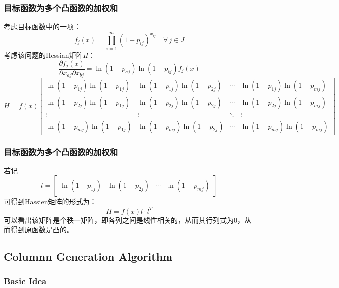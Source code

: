 \documentclass[10pt]{beamer}
\begin{document}
\begin{frame}
    \frametitle{目标函数为多个凸函数的加权和}
    考虑目标函数中的一项：
    \begin{equation*}
        f_j(x) =  \prod_{i=1}^m (1 -  p_{ij})^{x_{ij}}\quad \forall~  j \in J
    \end{equation*}
    考虑该问题的Hessian矩阵$H$：
    \begin{equation*}
        \frac{\partial f_j(x)}{\partial x_{aj} \partial x_{bj}} = \ln(1 - p_{aj}) \ln(1 - p_{bj}) f_j(x)
    \end{equation*}
    {
    \scriptsize
    \begin{equation*}
        H = f(x)\begin{bmatrix}
            \ln(1 - p_{1j}) \ln(1 - p_{1j}) & \ln(1 - p_{1j}) \ln(1 - p_{2j}) &\cdots & \ln(1 - p_{1j}) \ln(1 - p_{mj}) \\
            \ln(1 - p_{2j}) \ln(1 - p_{1j}) & \ln(1 - p_{2j}) \ln(1 - p_{2j}) &\cdots & \ln(1 - p_{2j}) \ln(1 - p_{mj}) \\
            \vdots & \vdots &\ddots &\vdots \\
            \ln(1 - p_{mj}) \ln(1 - p_{1j}) & \ln(1 - p_{mj}) \ln(1 - p_{2j}) &\cdots & \ln(1 - p_{mj}) \ln(1 - p_{mj})


        \end{bmatrix}
    \end{equation*}
    }
\end{frame}

\begin{frame}
    \frametitle{目标函数为多个凸函数的加权和}
    若记
    \begin{equation*}
        l = \begin{bmatrix}
            \ln(1 - p_{1j}) & \ln(1 - p_{2j}) & \cdots & \ln(1 - p_{mj})
        \end{bmatrix}
    \end{equation*}
    可得到Hassien矩阵的形式为：
    \begin{equation*}
        H = f(x)l\cdot l^T
    \end{equation*}
    可以看出该矩阵是个秩一矩阵，即各列之间是线性相关的，从而其行列式为0，从而得到原函数是凸的。
\end{frame}


\subsection{Columnn Generation Algorithm}
\begin{frame}
    \frametitle{Basic Idea}
    
\end{frame}
\end{document}
